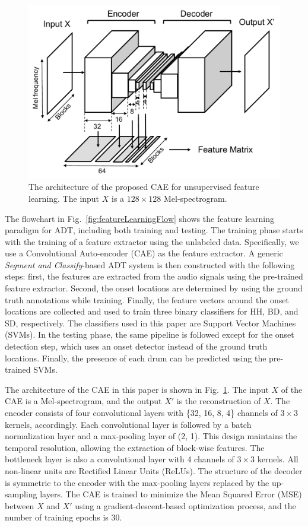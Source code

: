 \documentclass{article}
\begin{document}
\begin{figure}
\centering
\includegraphics[width = \columnwidth]{./figs/caeStructure.pdf}
\caption{The architecture of the proposed CAE for unsupervised feature learning. The input $X$ is a $128 \times 128$ Mel-spectrogram.}
\label{fig:caeStructure}
\end{figure}

The flowchart in Fig.~\ref{fig:featureLearningFlow} shows the feature learning paradigm for ADT, including both training and testing. The training phase starts with the training of a feature extractor using the unlabeled data. Specifically, we use a Convolutional Auto-encoder (CAE) as the feature extractor. A generic \textit{Segment and Classify}-based ADT system is then constructed with the following steps: first, the features are extracted from the audio signals using the pre-trained feature extractor. Second, the onset locations are determined by using the ground truth annotations while training. Finally, the feature vectors around the onset locations are collected and used to train three binary classifiers for HH, BD, and SD, respectively. The classifiers used in this paper are Support Vector Machines (SVMs). In the testing phase, the same pipeline is followed except for the onset detection step, which uses an onset detector instead of the ground truth locations. Finally, the presence of each drum can be predicted using the pre-trained SVMs. 

The architecture of the CAE in this paper is shown in Fig.~\ref{fig:caeStructure}. The input $X$ of the CAE is a Mel-spectrogram, and the output $X'$ is the reconstruction of $X$. The encoder consists of four convolutional layers with \{32, 16, 8, 4\} channels of $3 \times 3$ kernels, accordingly. Each convolutional layer is followed by a batch normalization layer and a max-pooling layer of (2, 1). This design maintains the temporal resolution, allowing the extraction of block-wise features. 
The bottleneck layer is also a convolutional layer with 4 channels of $3 \times 3$ kernels. All non-linear units are Rectified Linear Units (ReLUs).
The structure of the decoder is symmetric to the encoder with the max-pooling layers replaced by the up-sampling layers.  
The CAE is trained to minimize the Mean Squared Error (MSE) between $X$ and $X'$ using a gradient-descent-based optimization process, and the number of training epochs is $30$. 
\end{document}
